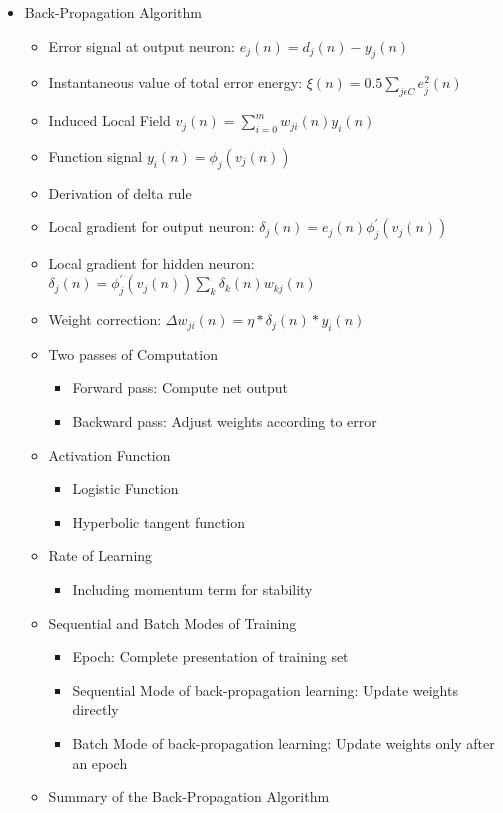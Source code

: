 \documentclass[paper=a4, fontsize=11pt]{scrartcl} %
\numberwithin{equation}{section} %
\numberwithin{figure}{section} %
\numberwithin{table}{section} %
\begin{document}
\begin{itemize}
	
	\item Back-Propagation Algorithm
	\begin{itemize}
		\item Error signal at output neuron: $e_j(n) = d_j(n) - y_j(n)$
		\item Instantaneous value of total error energy: $\xi (n) = 0.5\sum_{j\epsilon C} e_j^2(n)$
		\item Induced Local Field $v_j(n) = \sum_{i=0}^{m}w_{ji}(n)y_i(n)$
		\item Function signal $y_i(n) = \phi _j(v_j(n))$
		\item Derivation of delta rule
		\item Local gradient for output neuron: $\delta _j(n) = e_j(n)\phi _j^\prime(v_j(n))$
		\item Local gradient for hidden neuron: $\delta _j(n) = \phi _j^\prime (v_j(n))\sum_{k}\delta_k(n)w_{kj}(n)$
		\item Weight correction: $\Delta w_{ji}(n) = \eta * \delta _j(n) * y_i(n)$
		\item Two passes of Computation
		\begin{itemize}
			\item Forward pass: Compute net output
			\item Backward pass: Adjust weights according to error
		\end{itemize}
		\item Activation Function
		\begin{itemize}
			\item Logistic Function
			\item Hyperbolic tangent function
		\end{itemize}
		\item Rate of Learning
		\begin{itemize}
			\item Including momentum term for stability
		\end{itemize}
		\item Sequential and Batch Modes of Training
		\begin{itemize}
			\item Epoch: Complete presentation of training set
			\item Sequential Mode of back-propagation learning: Update weights directly
			\item Batch Mode of back-propagation learning: Update weights only after an epoch
		\end{itemize}
		\item Summary of the Back-Propagation Algorithm

\end{itemize}
\end{itemize}
\end{document}
